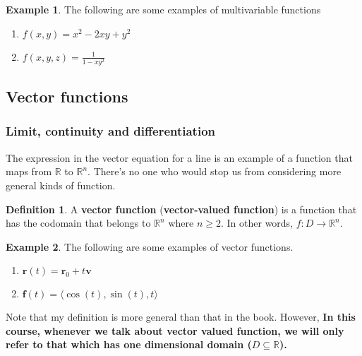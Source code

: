 \documentclass[
]{article}
\theoremstyle{definition}
\newtheorem{definition}{Definition}[section]
\theoremstyle{definition}
\newtheorem{example}{Example}[section]
\theoremstyle{definition}
\theoremstyle{definition}
\theoremstyle{remark}
\begin{document}
\begin{example}

The following are some examples of multivariable functions

\begin{enumerate}
\def\labelenumi{\arabic{enumi}.}
\item
  \(f(x,y) = x^2 - 2xy + y^2\)
\item
  \(f(x,y,z) = \frac{1}{1 - xy^2}\)
\end{enumerate}

\end{example}

\hypertarget{vector-functions}{%
\subsection{Vector functions}\label{vector-functions}}

\hypertarget{limit-continuity-and-differentiation}{%
\subsubsection{Limit, continuity and differentiation}\label{limit-continuity-and-differentiation}}

The expression in the vector equation for a line is an example of a function that maps from \(\mathbb{R}\) to \(\mathbb{R}^n\).
There's no one who would stop us from considering more general kinds of function.

\begin{definition}
A \textbf{vector function} (\textbf{vector-valued function}) is a function that has the codomain that belongs to \(\mathbb{R}^n\) where \(n\geq 2\). In other words, \(f: D \to \mathbb{R}^n\).
\end{definition}

\begin{example}

The following are some examples of vector functions.

\begin{enumerate}
\def\labelenumi{\arabic{enumi}.}
\item
  \(\mathbf{r}(t) = \mathbf{r}_0 + t\mathbf{v}\)
\item
  \(\mathbf{f}(t) = \langle \cos(t),\sin(t), t \rangle\)
\end{enumerate}

\end{example}

Note that my definition is more general than that in the book.
However,
\textbf{In this course, whenever we talk about vector valued function, we will only refer to
that which has one dimensional domain (\(D \subseteq \mathbb{R}\)).}
\end{document}
